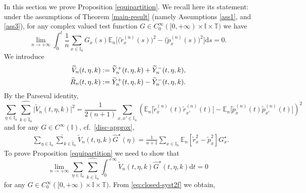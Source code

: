 \documentclass[EJP]{ejpecp} %
\newcommand\bbE{{\mathbb E}}
\newcommand\T{{\mathbb I}}
\newcommand{\bbT}{\mathbb T}
\newcommand{\dd  }{\mathrm{d}}
\renewcommand{\hat}{\widehat}
\renewcommand{\tilde}{\widetilde}
\numberwithin{equation}{section}
\begin{document}
In this section we prove Proposition \ref{equipartition}. We recall here its statement: under the assumptions of Theorem \ref{main-result} (namely Assumptions  \ref{ass1},    and  \ref{ass3}), for any complex valued test function $
G\in C_0^\infty([0,+\infty)\times \T\times\bbT)$ we have
 \begin{equation}
\label{042701-20bis}
\lim_{n\to+\infty}\int_0^{t} \frac 1{n}  \sum_{x\in\T_n}
                                                 G_x(s)
   {\mathbb E}_n\Big[\big(\tilde r_x^{(n)}(s) \big)^2-\big(\tilde p_x^{(n)}(s) \big)^2\Big]\dd s=0.
\end{equation}
We introduce
\begin{align}
\label{Vn}
\tilde  V_n(t,\eta,k)&:=
 \tilde   Y_n^+(t,\eta,k)+\tilde   Y_n^-(t,\eta,k),\\
\tilde  R_n(t,\eta,k)&:=
 \tilde   Y_n^+(t,\eta,k)-\tilde   Y_n^-(t,\eta,k).\notag
\end{align}
By the Parseval identity,
\begin{equation}
\label{032701-20}
\sum_{\eta\in\T_n}\underset{{k\in \widehat{\T}_n}}{{\hat\sum}}\big|\tilde  V_n(t,\eta,k)\big|^2= \frac{1}{2(n+1)}\sum_{x,x'\in\T_n}\left(\bbE_n\big[\tilde
  r_x^{(n)}(t)\tilde r_{x'}^{(n)}(t)\big]-\bbE_n\big[\tilde p_x^{(n)}(t)\tilde
  p_{x'}^{(n)}(t)\big]\right)^2
\end{equation}
and for any  $G\in C^\infty(\T)$, cf.~\eqref{disc-approx},
\begin{align*}
&\sum_{\eta\in\T_n}\underset{{k\in \widehat{\T}_n}}{{\hat\sum}}
 \tilde  V_n(t,\eta,k)\hat
  G^\star(\eta)=\frac{1}{n+1}\sum_{x\in\T_n}\mathbb E_n\left[
  \tilde  r_x^2-\tilde  p_x^2\right]
  G^\star_x.
\end{align*}
To prove Proposition \ref{equipartition}  we need to show that
 \begin{equation}
\label{040511-19}
\lim_{n\to+\infty}\sum_{\eta\in\T_n}\underset{{k\in \widehat{\T}_n}}{{\hat\sum}}\int_0^{+\infty}\tilde  V_n(t,\eta,k)\hat
G^\star(t,\eta,k)
\dd t=0
\end{equation}
 for any  $
G\in C_0^\infty([0,+\infty)\times \T\times\bbT)$.
From \eqref{eq:closed-syst2f} 
we obtain,
\end{document}
